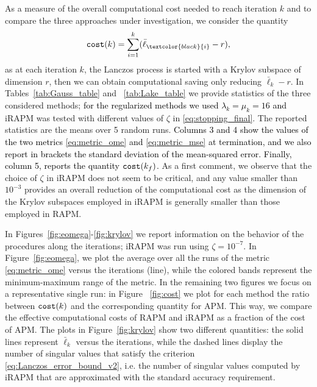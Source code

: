 \documentclass[pdflatex,sn-mathphys-num]{sn-jnl}
\numberwithin{equation}{section}%
\newcommand{\REV}[1]{\textcolor{black}{#1}}
\theoremstyle{thmstyleone}%
\theoremstyle{thmstyletwo}%
\theoremstyle{thmstylethree}%
\begin{document}
{As a measure of the overall computational cost needed to reach iteration $k$ and to compare the three approaches under investigation,  we consider the quantity 
$$
    \mbox{\tt cost}(k)=\sum_{i=1}^k (\bar \ell_{\REV{i}}-r),
$$
as at each iteration $k$, the Lanczos process is started with a Krylov subspace of dimension $r$, then we can obtain computational saving only reducing $\bar \ell_k-r$.
}
In Tables~\ref{tab:Gauss_table} and ~\ref{tab:Lake_table} we provide statistics  of the three considered methods; \REV{for the regularized methods we used $\lambda_k = \mu_k = 16$ and} iRAPM was tested  with different values of   $\zeta$ in \eqref{eq:stopping_final}.
The reported statistics are the means over 5 random runs. 
\REV{Columns 3 and 4 show the values of the two metrics \eqref{eq:metric_ome} and \eqref{eq:metric_mse} at termination, and we also report in brackets the  standard deviation of the mean-squared error. Finally, column 5, reports the quantity $\mbox{\tt cost}(k_f)$.}
As a first comment, we observe that the choice of $\zeta$ in iRAPM does not seem to be critical, and any value smaller than $10^{-3}$ provides an overall reduction of the computational cost as the dimension of the Krylov subspaces employed in iRAPM is generally smaller than those employed in RAPM.

{In Figures~\ref{fig:eomega}-\ref{fig:krylov} we report information on the behavior of the procedures along the iterations; iRAPM was run using $\zeta = 10^{-7}$. In Figure~\ref{fig:eomega}, we plot the average over all the runs of the metric \eqref{eq:metric_ome} versus the iterations (line), while the colored bands represent the minimum-maximum range of the metric. In the remaining two figures we focus on a representative single run: in Figure ~\ref{fig:cost} we plot for each method the ratio between $\mbox{\tt cost}(k)$ and the corresponding quantity for APM.  
This way, we compare the effective computational costs of RAPM and iRAPM as a fraction of the cost of APM. The plots in Figure~\ref{fig:krylov} show two different quantities: the solid lines represent $\bar \ell_k$ versus the iterations, while the dashed lines display the number of singular values that satisfy the criterion \eqref{eq:Lanczos_error_bound_v2}, i.e. the number of singular values computed by iRAPM that are approximated with the standard accuracy requirement.}
 
\end{document}
